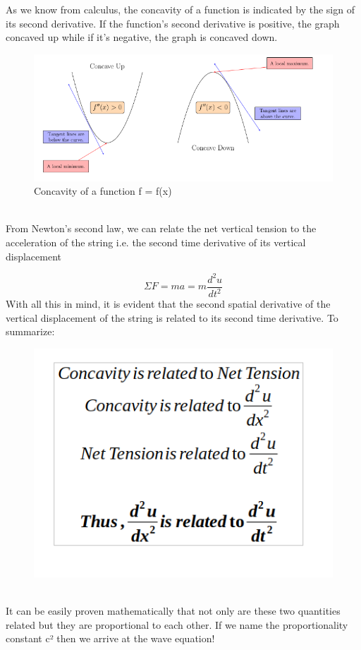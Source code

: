 \documentclass[oneside,hidelinks]{book}
\begin{document}
                As we know from calculus, the concavity 
                of a function is indicated by the sign of
                 its second derivative. If the function's 
                 second derivative is positive, the graph 
                  concaved up while if it's negative, the graph
                 is concaved down.
                 \begin{figure}[hbtp]
                        \caption{Concavity of a function f = f(x)}                        
                        \hspace*{2cm}\includegraphics[scale=0.5]{concave.png}
                \end{figure}\\
                From Newton's second law, we can relate the net vertical
                tension to the acceleration of the string i.e. 
                the second time derivative of its vertical displacement

                $$\Sigma F=ma=m\frac{d^2u}{dt^2}$$
                With all this in mind, it is evident that 
                the second spatial derivative of the vertical 
                displacement of the string is related to its second 
                time derivative. To summarize:
                \begin{figure}[hbtp]
                        \caption{}                        
                        \hspace*{4cm}\includegraphics[scale=0.5]{summary.png}
                \end{figure}\\
                It can be easily proven mathematically that not
                 only are these two quantities related but they
                  are proportional to each other. If we name the 
                  proportionality constant c² then we arrive at the
                   wave equation!
\end{document}
